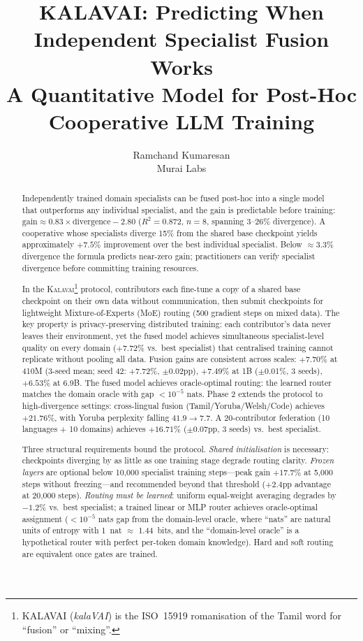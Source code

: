 \documentclass{article}
\title{KALAVAI: Predicting When Independent Specialist Fusion Works\\
       A Quantitative Model for Post-Hoc Cooperative LLM Training}
\author{%
  Ramchand Kumaresan \\
  Murai Labs
}
\newcommand{\kalavai}{\textsc{Kalavai}\xspace}
\begin{document}
\maketitle

\begin{abstract}
Independently trained domain specialists can be fused post-hoc into a single model that outperforms any individual specialist, and the gain is predictable before training:
$\text{gain} \approx 0.83 \times \text{divergence} - 2.80$ ($R^2 = 0.872$, $n=8$, spanning 3--26\% divergence).
A cooperative whose specialists diverge 15\% from the shared base checkpoint yields approximately $+7.5\%$ improvement over the best individual specialist.
Below $\approx$3.3\% divergence the formula predicts near-zero gain; practitioners can verify specialist divergence before committing training resources.

In the \kalavai\footnote{KALAVAI (\textit{kalaVAI}) is the ISO~15919 romanisation of the Tamil word for ``fusion'' or ``mixing''.} protocol, contributors each fine-tune a copy of a shared base checkpoint on their own data without communication, then submit checkpoints for lightweight Mixture-of-Experts (MoE) routing (500 gradient steps on mixed data).
The key property is privacy-preserving distributed training: each contributor's data never leaves their environment, yet the fused model achieves simultaneous specialist-level quality on every domain ($+7.72\%$ vs.\ best specialist) that centralised training cannot replicate without pooling all data.
Fusion gains are consistent across scales: $+7.70\%$ at 410M (3-seed mean; seed 42: $+7.72\%$, $\pm$0.02pp), $+7.49\%$ at 1B ($\pm$0.01\%, 3 seeds), $+6.53\%$ at 6.9B.
The fused model achieves oracle-optimal routing: the learned router matches the domain oracle with gap $<10^{-5}$ nats.
Phase 2 extends the protocol to high-divergence settings: cross-lingual fusion (Tamil/Yoruba/Welsh/Code) achieves $+21.76\%$, with Yoruba perplexity falling $41.9\to7.7$.
A 20-contributor federation (10 languages + 10 domains) achieves $+16.71\%$ ($\pm$0.07pp, 3 seeds) vs.\ best specialist.

Three structural requirements bound the protocol. \emph{Shared initialisation} is necessary: checkpoints diverging by as little as one training stage degrade routing clarity. \emph{Frozen layers} are optional below 10,000 specialist training steps---peak gain $+17.7\%$ at 5,000 steps without freezing---and recommended beyond that threshold ($+2.4$pp advantage at 20,000 steps). \emph{Routing must be learned}: uniform equal-weight averaging degrades by $-1.2\%$ vs.\ best specialist; a trained linear or MLP router achieves oracle-optimal assignment ($<10^{-5}$ nats gap from the domain-level oracle, where ``nats'' are natural units of entropy with 1~nat $\approx$ 1.44~bits, and the ``domain-level oracle'' is a hypothetical router with perfect per-token domain knowledge). Hard and soft routing are equivalent once gates are trained.
\end{abstract}
\end{document}
